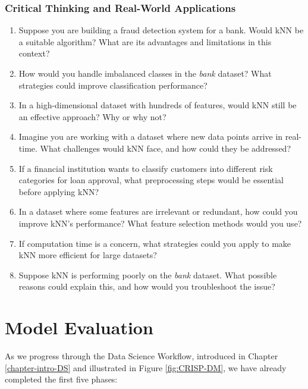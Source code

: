 \documentclass[
  11pt,
]{book}
\providecommand{\tightlist}{%
  \setlength{\itemsep}{0pt}\setlength{\parskip}{0pt}}
\theoremstyle{definition}
\theoremstyle{definition}
\theoremstyle{definition}
\theoremstyle{definition}
\theoremstyle{remark}
\begin{document}
\subsection*{Critical Thinking and Real-World Applications}\label{critical-thinking-and-real-world-applications}


\begin{enumerate}
\def\labelenumi{\arabic{enumi}.}
\setcounter{enumi}{26}
\tightlist
\item
  Suppose you are building a fraud detection system for a bank. Would kNN be a suitable algorithm? What are its advantages and limitations in this context?\\
\item
  How would you handle imbalanced classes in the \emph{bank} dataset? What strategies could improve classification performance?\\
\item
  In a high-dimensional dataset with hundreds of features, would kNN still be an effective approach? Why or why not?\\
\item
  Imagine you are working with a dataset where new data points arrive in real-time. What challenges would kNN face, and how could they be addressed?\\
\item
  If a financial institution wants to classify customers into different risk categories for loan approval, what preprocessing steps would be essential before applying kNN?\\
\item
  In a dataset where some features are irrelevant or redundant, how could you improve kNN's performance? What feature selection methods would you use?\\
\item
  If computation time is a concern, what strategies could you apply to make kNN more efficient for large datasets?\\
\item
  Suppose kNN is performing poorly on the \emph{bank} dataset. What possible reasons could explain this, and how would you troubleshoot the issue?
\end{enumerate}

\chapter{Model Evaluation}\label{chapter-evaluation}

As we progress through the Data Science Workflow, introduced in Chapter \ref{chapter-intro-DS} and illustrated in Figure \ref{fig:CRISP-DM}, we have already completed the first five phases:
\end{document}
